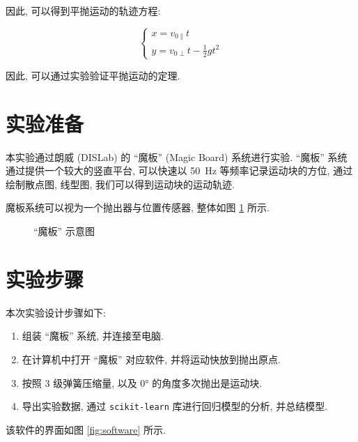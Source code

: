 \documentclass{article}
\begin{document}
因此, 可以得到平抛运动的轨迹方程:

\begin{equation}
    \begin{cases}
        x = v_{0\parallel}t \\
        y = v_{0\perp}t - \frac{1}{2}gt^2
    \end{cases}
\end{equation}

因此, 可以通过实验验证平抛运动的定理.

\section{实验准备}

本实验通过朗威 (DISLab) 的 ``魔板'' (Magic Board) 系统进行实验. ``魔板'' 系统通过提供一个较大的竖直平台, 可以快速以 \qty{50}{\hertz} 等频率记录运动块的方位, 通过绘制散点图, 线型图, 我们可以得到运动块的运动轨迹.

魔板系统可以视为一个抛出器与位置传感器, 整体如图 \ref{fig:magic-board} 所示.

\begin{figure}[H]
    \centering
    \caption{``魔板'' 示意图}
    \label{fig:magic-board}
\end{figure}

\section{实验步骤}

本次实验设计步骤如下:

\begin{enumerate}
    \item 组装 ``魔板'' 系统, 并连接至电脑.
    \item 在计算机中打开 ``魔板'' 对应软件, 并将运动快放到抛出原点.
    \item 按照 $3$ 级弹簧压缩量, 以及 \ang{0} 的角度多次抛出是运动块.
    \item 导出实验数据, 通过 \texttt{scikit-learn} 库进行回归模型的分析, 并总结模型.
\end{enumerate}

该软件的界面如图 \ref{fig:software} 所示.
\end{document}
